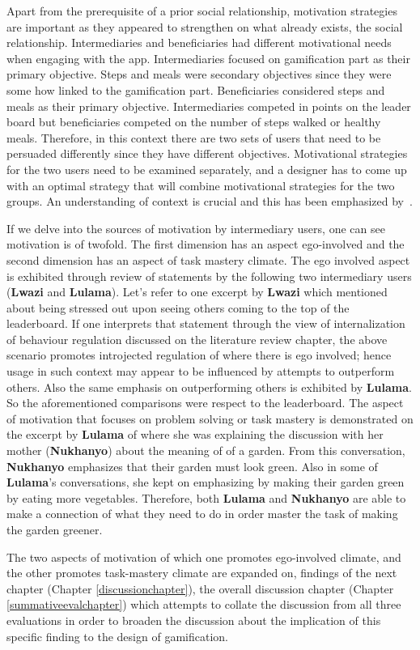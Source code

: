 Apart from the prerequisite of a prior social relationship, motivation strategies are important as they appeared to strengthen on what already exists, the social relationship. Intermediaries and beneficiaries had different motivational needs when engaging with the app. Intermediaries focused on gamification part as their primary objective. Steps and meals were secondary objectives since they were some how linked to the gamification part. Beneficiaries considered steps and meals as their primary objective. Intermediaries competed in points on the leader board but beneficiaries competed on the number of steps walked or healthy meals. Therefore, in this context there are two sets of users that need to be persuaded differently since they have different objectives. Motivational strategies for the two users need to be examined separately, and a designer has to come up with an optimal strategy that will combine motivational strategies for the two groups. An understanding of context is crucial and this has been emphasized by~\citep{Oinas-kukkonen:psd, Oinas-Kukkonen:foundation}. 

If we delve into the sources of motivation by intermediary users, one can see motivation is of twofold. The first dimension has an aspect ego-involved and the second dimension has an aspect of task mastery climate. The ego involved aspect is exhibited through review of statements by the following two intermediary users (\textbf{Lwazi} and \textbf{Lulama}). Let's refer to one excerpt by \textbf{Lwazi} which mentioned about being stressed out upon seeing others coming to the top of the leaderboard. If one interprets that statement through the view of internalization of behaviour regulation discussed on the literature review chapter, the above scenario promotes introjected regulation of where there is ego involved; hence usage in such context may appear to be influenced by attempts to outperform others. Also the same emphasis on outperforming others is exhibited by \textbf{Lulama}. So the aforementioned comparisons were respect to the leaderboard. The aspect of motivation that focuses on problem solving or task mastery is demonstrated on the excerpt by \textbf{Lulama} of where she was explaining the discussion with her mother (\textbf{Nukhanyo}) about the meaning of of a garden. From this conversation, \textbf{Nukhanyo} emphasizes that their garden must look green. Also in some of \textbf{Lulama}'s conversations, she kept on emphasizing by making their garden green by eating more vegetables. Therefore, both \textbf{Lulama} and \textbf{Nukhanyo} are able to make a connection of what they need to do in order master the task of making the garden greener.  

The two aspects of motivation of which one promotes ego-involved climate, and the other promotes task-mastery climate are expanded on, findings of the next chapter (Chapter \ref{discussionchapter}), the overall discussion chapter (Chapter \ref{summativeevalchapter}) which attempts to collate the discussion from all three evaluations in order to broaden the discussion about the implication of this specific finding to the design of gamification.
 
\begin{flushright}
\end{flushright}
